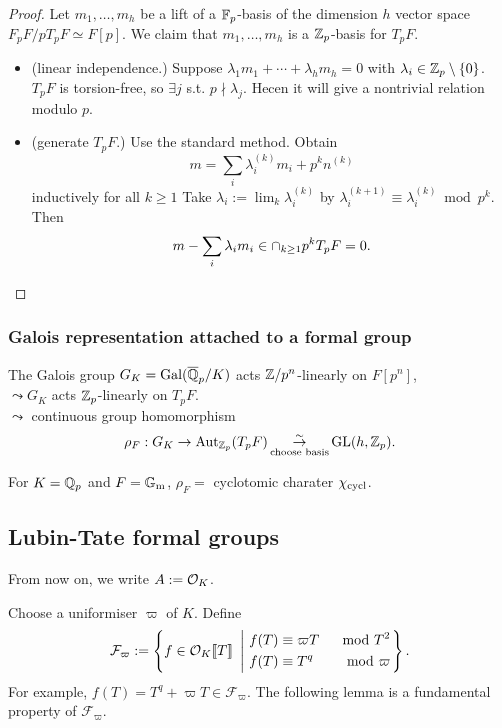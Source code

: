\begin{proof}
    Let $m_1, \dots, m_h$ be a lift of a $\mathbb{F}_p$-basis of the dimension $h$ vector space $F_pF/pT_pF\simeq F[p]$.
    We claim that $m_1, \dots, m_h$ is a $\mathbb{Z}_p$-basis for $T_pF$.
    \begin{itemize}
        \item (linear independence.)
        Suppose $\lambda_1m_1 + \cdots + \lambda_h m_h = 0$ with $\lambda_i\in\mathbb{Z}_p\setminus \{0\}$.
        $T_pF$ is torsion-free, so $\exists j$ s.t. $p\nmid \lambda_j$.
        Hecen it will give a nontrivial relation modulo $p$.
        \item (generate $T_pF$.)
        Use the standard method.
        Obtain \[m = \sum_i \lambda_i^{(k)} m_i + p^kn^{(k)}\] inductively for all $k\ge 1$
        Take $\lambda_i := \lim_k\lambda_i^{(k)}$
        by $\lambda_i^{(k+1)}\equiv \lambda_i^{(k)}\bmod p^{k}$.
        Then \[m - \sum_{i}\lambda_im_i\in\cap_{k\ge 1}p^kT_pF = 0.\qedhere\]
    \end{itemize}
\end{proof}


\subsubsection{Galois representation attached to a formal group}
The Galois group $G_K = \operatorname{Gal}(\overline{\mathbb{Q}}_p/K)$ acts $\mathbb{Z}/p^n$-linearly on $F[p^n]$,\\
$\leadsto G_K$ acts $\mathbb{Z}_p$-linearly on $T_pF$.\\
$\leadsto$ continuous group homomorphism \[\rho_F : G_K\to\operatorname{Aut}_{\mathbb{Z}_p}(T_pF)\mathop{\stackrel{\sim}{\rightarrow}}_{\text{choose basis}} \operatorname{GL}(h, \mathbb{Z}_p).\]
\begin{example}
    For $K = \mathbb{Q}_p$ and $F = {\mathbb{G}_{\mathrm{m}}}$, $\rho_F = $ cyclotomic charater $\chi_{\mathrm{cycl}}$.
\end{example}






\subsection{Lubin-Tate formal groups}
From now on, we write $A := \mathcal{O}_K$.

Choose a uniformiser $\varpi$ of $K$. Define
\[\mathcal{F}_\varpi := \left\{f\in\mathcal{O}_K\llbracket T \rrbracket\ \left|\ \begin{aligned}
    &f(T) \equiv \varpi T&\mod {T^2} \\
    &f(T)\equiv T^q&\mod \varpi
\end{aligned}\right.\right\}.\]
For example, $f(T) = T^q + \varpi T\in\mathcal{F}_\varpi$.
The following lemma is a fundamental property of $\mathcal{F}_\varpi$.

